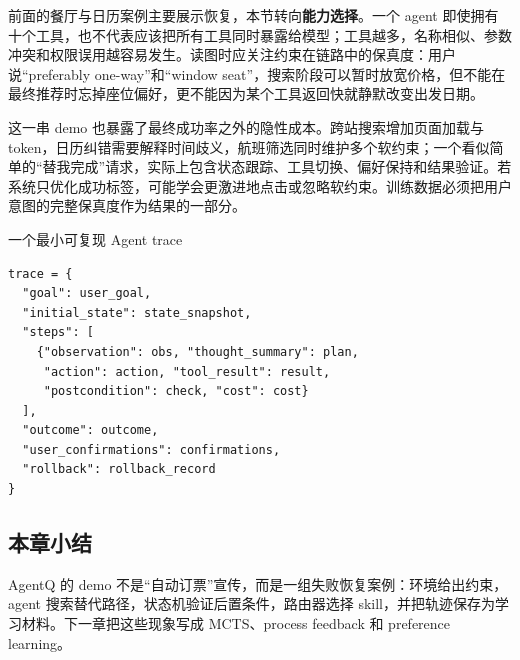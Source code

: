 前面的餐厅与日历案例主要展示恢复，本节转向\textbf{能力选择}。一个 agent 即使拥有十个工具，也不代表应该把所有工具同时暴露给模型；工具越多，名称相似、参数冲突和权限误用越容易发生。读图时应关注约束在链路中的保真度：用户说“preferably one-way”和“window seat”，搜索阶段可以暂时放宽价格，但不能在最终推荐时忘掉座位偏好，更不能因为某个工具返回快就静默改变出发日期。





这一串 demo 也暴露了最终成功率之外的隐性成本。跨站搜索增加页面加载与 token，日历纠错需要解释时间歧义，航班筛选同时维护多个软约束；一个看似简单的“替我完成”请求，实际上包含状态跟踪、工具切换、偏好保持和结果验证。若系统只优化成功标签，可能学会更激进地点击或忽略软约束。训练数据必须把用户意图的完整保真度作为结果的一部分。


\begin{importantbox}{一个最小可复现 Agent trace}
\begin{lstlisting}[caption={Agent 轨迹应保存的最小字段}]
trace = {
  "goal": user_goal,
  "initial_state": state_snapshot,
  "steps": [
    {"observation": obs, "thought_summary": plan,
     "action": action, "tool_result": result,
     "postcondition": check, "cost": cost}
  ],
  "outcome": outcome,
  "user_confirmations": confirmations,
  "rollback": rollback_record
}
\end{lstlisting}
\end{importantbox}

\subsection{本章小结}

AgentQ 的 demo 不是“自动订票”宣传，而是一组失败恢复案例：环境给出约束，agent 搜索替代路径，状态机验证后置条件，路由器选择 skill，并把轨迹保存为学习材料。下一章把这些现象写成 MCTS、process feedback 和 preference learning。

